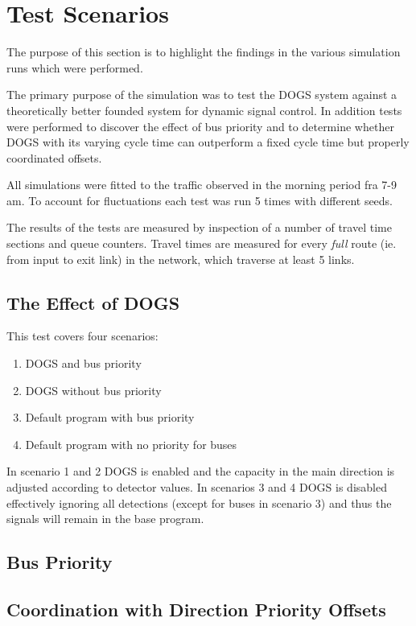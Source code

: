 \section{Test Scenarios}
The purpose of this section is to highlight the findings in the various simulation runs which were performed.

The primary purpose of the simulation was to test the DOGS system against a theoretically better founded system for dynamic signal control. In addition tests were performed to discover the effect of bus priority and to determine whether DOGS with its varying cycle time can outperform a fixed cycle time but properly coordinated offsets.

All simulations were fitted to the traffic observed in the morning period fra 7-9 am.
To account for fluctuations each test was run 5 times with different seeds.

The results of the tests are measured by inspection of a number of travel time sections and queue counters. Travel times are measured for every \textit{full} route (ie. from input to exit link) in the network, which traverse at least 5 links.

\subsection{The Effect of DOGS}
This test covers four scenarios:

\begin{enumerate}
\item DOGS and bus priority
\item DOGS without bus priority
\item Default program with bus priority
\item Default program with no priority for buses
\end{enumerate}

In scenario 1 and 2 DOGS is enabled and the capacity in the main direction is adjusted according to detector values. In scenarios 3 and 4 DOGS is disabled effectively ignoring all detections (except for buses in scenario 3) and thus the signals will remain in the base program.

\subsection*{Bus Priority}


\subsection{Coordination with Direction Priority Offsets}


